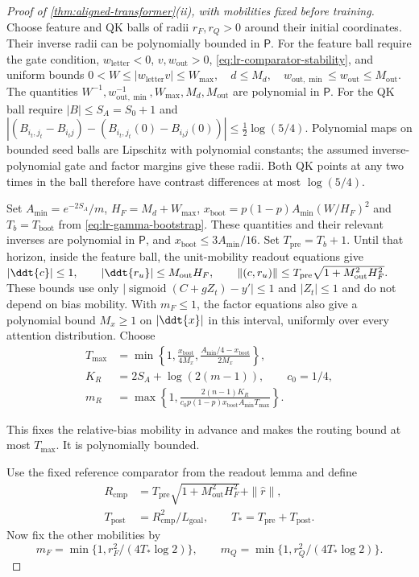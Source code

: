 \begin{proof}[Proof of \cref{thm:aligned-transformer}(ii), with mobilities fixed before training]
Choose feature and QK balls of radii $r_F,r_Q>0$ around their initial
coordinates. Their inverse radii can be polynomially bounded in $\mathsf P$.
For the feature ball require the gate condition, $w_{\mathrm{letter}}<0$, $v,w_{\mathrm{out}}>0$,
\eqref{eq:lr-comparator-stability}, and uniform bounds
 $0<W\le|{w_{\mathrm{letter}} v}|\le W_{\max},\quad d\le M_d,\quad w_{\mathrm{out},\min}\le w_{\mathrm{out}}\le M_{\mathrm{out}}.$ 
The quantities $W^{-1},w_{\mathrm{out},\min}^{-1},W_{\max},M_d,M_{\mathrm{out}}$ are
polynomial in $\mathsf P$. For the QK ball require $|B|\le S_A=S_0+1$ and
 $|(B_{i_t,j_t}-B_{i_tj})-(B_{i_t,j_t}(0)-B_{i_tj}(0))| \le\tfrac12\log(5/4).$ 
Polynomial maps on bounded seed balls are Lipschitz with polynomial
constants; the assumed inverse-polynomial gate and factor margins give
these radii. Both QK points at any two times in the ball therefore have
contrast differences at most $\log(5/4)$.

Set $A_{\min}=e^{-2S_A}/m$, $H_F=M_d+W_{\max}$,
$x_{\mathrm{boot}}=p(1-p) A_{\min}(W/H_F)^2$ and $T_b=T_{\mathrm{boot}}$ from
\eqref{eq:lr-gamma-bootstrap}. These quantities and their relevant
inverses are polynomial in $\mathsf P$, and $x_{\mathrm{boot}}\le3A_{\min}/16$.
Set $T_{\mathrm{pre}}=T_b+1$. Until that horizon, inside the feature
ball, the unit-mobility readout equations give
 $|\ddt{c}|\le1,\qquad |\ddt{r_u}|\le M_{\mathrm{out}} H_F, \qquad \|(c,r_u)\|\le T_{\mathrm{pre}}\sqrt{1+M_{\mathrm{out}}^2H_F^2}.$ 
These bounds use only $|\operatorname{sigmoid}(C+gZ_t)-y'|\le1$ and $|Z_t|\le1$ and do not
depend on bias mobility. With $m_F\le1$, the factor equations also
give a polynomial bound $M_x\ge1$ on $|\ddt{x}|$ in this interval,
uniformly over every attention distribution. Choose
\[
\begin{aligned}
 T_{\max}&=\min\left\{1,\frac{x_{\mathrm{boot}}}{4M_x},
                \frac{A_{\min}/4-x_{\mathrm{boot}}}{2M_x}\right\},\\
 K_R&=2S_A+\log(2(m-1)),\qquad c_0=1/4,\\
 m_R&=\max\left\{1,\frac{2(n-1)K_R}
          {c_0p(1-p)x_{\mathrm{boot}} A_{\min}T_{\max}}\right\}.
\end{aligned}
\]

This fixes the relative-bias mobility in advance and makes the routing
bound at most $T_{\max}$. It is polynomially bounded.

Use the fixed reference comparator from the readout lemma and define
\[
\begin{aligned}
 R_{\mathrm{cmp}}&=T_{\mathrm{pre}}\sqrt{1+M_{\mathrm{out}}^2H_F^2}+\|\widehat r\|,\\
 T_{\mathrm{post}}&=R_{\mathrm{cmp}}^2/L_{\mathrm{goal}},\qquad
 T_*=T_{\mathrm{pre}}+T_{\mathrm{post}}.
\end{aligned}
\]
Now fix the other mobilities by
\[
 m_F=\min\{1,r_F^2/(4T_*\log2)\},\qquad
 m_Q=\min\{1,r_Q^2/(4T_*\log2)\}.
\]


\end{proof}
